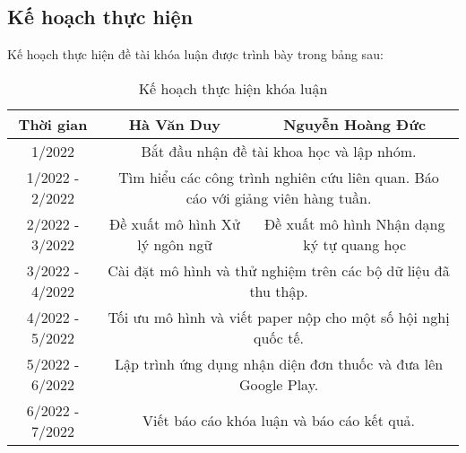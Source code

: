 \subsection*{Kế hoạch thực hiện}

Kế hoạch thực hiện đề tài khóa luận được trình bày trong bảng sau:

 \begin{table}
    \centering
    \normalsize  
    \begin{adjustbox}{angle=-90}
    \begin{tabular}{|c|c|c|}
    
        \hline 
        Thời gian & Hà Văn Duy & Nguyễn Hoàng Đức \\\hline
        
        1/2022 & \multicolumn{2}{|c|}{Bắt đầu nhận đề tài khoa học và lập nhóm.} \\\hline
        
        1/2022 - 2/2022 & \multicolumn{2}{|c|}{Tìm hiểu các công trình nghiên cứu liên quan. Báo cáo với giảng viên hàng tuần.} \\\hline
        
        2/2022 - 3/2022 & Đề xuất mô hình Xử lý ngôn ngữ & Đề xuất mô hình Nhận dạng ký tự quang học \\\hline
        3/2022 - 4/2022 & \multicolumn{2}{|c|}{Cài đặt mô hình và thử nghiệm trên các bộ dữ liệu đã thu thập.} \\\hline
        
        4/2022 - 5/2022 &  \multicolumn{2}{|c|}{Tối ưu mô hình và viết paper nộp cho một số hội nghị quốc tế.} \\\hline
        5/2022 - 6/2022 & \multicolumn{2}{|c|}{Lập trình ứng dụng nhận diện đơn thuốc và đưa lên Google Play.} \\\hline
        6/2022 - 7/2022 & \multicolumn{2}{|c|}{Viết báo cáo khóa luận và báo cáo kết quả.} \\\hline
    \end{tabular}
    \end{adjustbox}
    \caption{Kế hoạch thực hiện khóa luận}
    
    \end{table}
    
    
